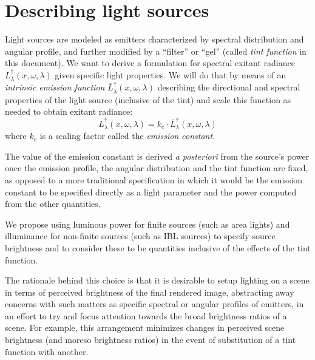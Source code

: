 \section{Describing light sources}\label{ch:specification}

Light sources are modeled as emitters characterized by spectral distribution
and angular profile, and further modified by a ``filter'' or ``gel'' (called
\textsl{tint function} in this document). We want to derive a formulation for
spectral exitant radiance $L_{\lambda}^\uparrow(x,\omega,\lambda)$ given
specific light properties. We will do that by means of an \textsl{intrinsic
emission function} $\overline{L}^\uparrow_{\lambda}(x,\omega,\lambda)$
describing the directional and spectral properties of the light source
(inclusive of the tint) and scale this function as needed to obtain exitant
radiance:
\begin{equation}
L_{\lambda}^\uparrow(x, \omega, \lambda) = k_e \cdot
\overline{L}^\uparrow_{\lambda}(x, \omega, \lambda)
\end{equation}
where $k_e$ is a scaling factor called the \textsl{emission constant}.


The value of the emission constant is derived \emph{a posteriori} from the
source's power once the emission profile, the angular distribution and the tint
function are fixed, as opposed to a more traditional specification in which it
would be the emission constant to be specified directly as a light parameter and
the power computed from the other quantities.

We propose using luminous power for finite
sources (such as area lights) and illuminance for non-finite sources (such as
\gls{IBL} sources) to specify source brightness and to consider these to be
quantities inclusive of the effects of the tint function.

The rationale behind this choice is that it is desirable to setup lighting
on a scene in terms of perceived brightness of the final rendered image,
abstracting away concerns with such matters as specific spectral or angular
profiles of emitters, in an effort to try and focus attention towards the broad
brightness ratios of a scene.
For example, this arrangement minimizes changes in perceived scene brightness
(and moreso brightness ratios) in the event of substitution of a tint function
with another.

